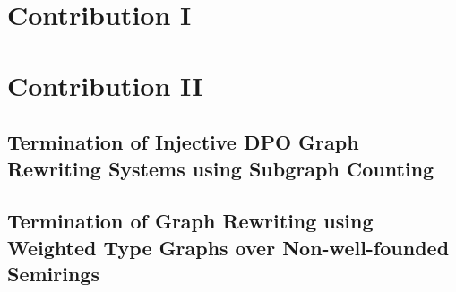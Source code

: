 \documentclass{book}
\begin{document}




 
\part{Contribution I}
\label{part:morphisms_from_gls_to_grs}
% 
%     
%     
%     
  
\part{Contribution II}
 \label{part:terminating_injective_dpo_grs}
 
    \chapter{Termination of Injective DPO Graph Rewriting Systems using Subgraph Counting}
    \label{sec:subgraph_counting}
    
    \chapter{Termination of Graph Rewriting using Weighted Type Graphs over Non-well-founded Semirings}
\end{document}
